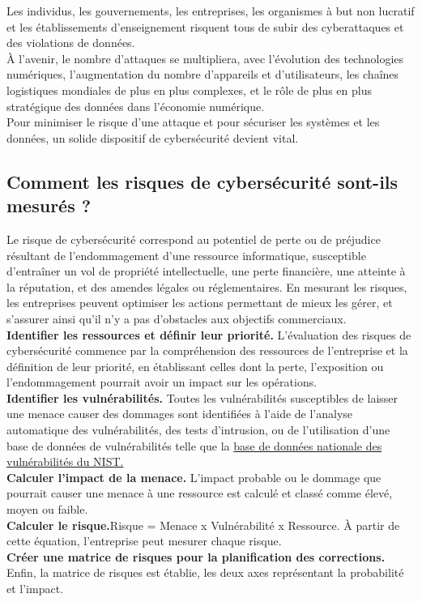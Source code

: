 Les individus, les gouvernements, les entreprises, les organismes à but non lucratif et les établissements d’enseignement risquent tous de subir des cyberattaques et des violations de données.\\
 À l’avenir, le nombre d’attaques se multipliera, avec l’évolution des technologies numériques, l’augmentation du nombre d’appareils et d’utilisateurs, les chaînes logistiques mondiales de plus en plus complexes, et le rôle de plus en plus stratégique des données dans l’économie numérique.\\
  Pour minimiser le risque d’une attaque et pour sécuriser les systèmes et les données, un solide dispositif de cybersécurité devient vital.\\
\subsection{Comment les risques de cybersécurité sont-ils mesurés ?}
Le risque de cybersécurité correspond au potentiel de perte ou de préjudice résultant de l’endommagement d’une ressource informatique, susceptible d’entraîner un vol de propriété intellectuelle, une perte financière, une atteinte à la réputation, et des amendes légales ou réglementaires. En mesurant les risques, les entreprises peuvent optimiser les actions permettant de mieux les gérer, et s’assurer ainsi qu’il n’y a pas d’obstacles aux objectifs commerciaux.\\

\textbf{Identifier les ressources et définir leur priorité.} L’évaluation des risques de cybersécurité commence par la compréhension des ressources de l’entreprise et la définition de leur priorité, en établissant celles dont la perte, l’exposition ou l’endommagement pourrait avoir un impact sur les opérations.\\

\textbf{Identifier les vulnérabilités.}
 Toutes les vulnérabilités susceptibles de laisser une menace causer des dommages sont identifiées à l’aide de l’analyse automatique des vulnérabilités, des tests d’intrusion, ou de l’utilisation d’une base de données de vulnérabilités telle que la  \href{https://nvd.nist.gov/}{base de données nationale des vulnérabilités du NIST.}\\
 
 \textbf{Calculer l’impact de la menace.} L’impact probable ou le dommage que pourrait causer une menace à une ressource est calculé et classé comme élevé, moyen ou faible.\\
 \textbf{Calculer le risque.}Risque = Menace x Vulnérabilité x Ressource. À partir de cette équation, l’entreprise peut mesurer chaque risque.\\
\textbf{ Créer une matrice de risques pour la planification des corrections.} Enfin, la matrice de risques est établie, les deux axes représentant la probabilité et l’impact.\\


